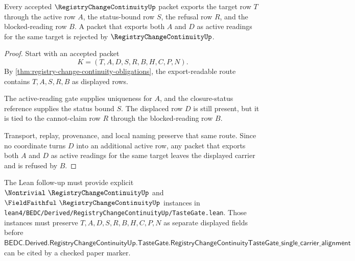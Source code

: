 \begin{theorem}
\label{thm:registry-change-continuity-active-reading-refusal}
Every accepted $\RegistryChangeContinuityUp$ packet exports the target row $T$ through the active row $A$, the status-bound row $S$, the refusal row $R$, and the blocked-reading row $B$. A packet that exports both $A$ and $D$ as active readings for the same target is rejected by $\RegistryChangeContinuityUp$.
\end{theorem}
\begin{proof}
Start with an accepted packet
$$
K=(T,A,D,S,R,B,H,C,P,N).
$$
By \autoref{thm:registry-change-continuity-obligations}, the export-readable route contains $T,A,S,R,B$ as displayed rows.

The active-reading gate supplies uniqueness for $A$, and the closure-status reference supplies the status bound $S$. The displaced row $D$ is still present, but it is tied to the cannot-claim row $R$ through the blocked-reading row $B$.

Transport, replay, provenance, and local naming preserve that same route. Since no coordinate turns $D$ into an additional active row, any packet that exports both $A$ and $D$ as active readings for the same target leaves the displayed carrier and is refused by $B$.
\end{proof}



The Lean follow-up must provide explicit $\Nontrivial\ \RegistryChangeContinuityUp$ and $\FieldFaithful\ \RegistryChangeContinuityUp$ instances in \texttt{lean4/BEDC/Derived/RegistryChangeContinuityUp/TasteGate.lean}. Those instances must preserve $T,A,D,S,R,B,H,C,P,N$ as separate displayed fields before $\mathsf{BEDC.Derived.RegistryChangeContinuityUp.TasteGate.RegistryChangeContinuityTasteGate\_single\_carrier\_alignment}$ can be cited by a checked paper marker.


